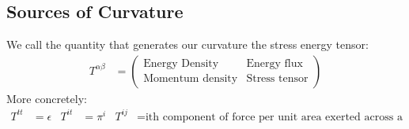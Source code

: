  \subsection{Sources of Curvature}
 We call the quantity that generates our curvature the stress energy tensor:
 \begin{align*}
	 T^{\alpha\beta} &= \begin{pmatrix}
		 \text{Energy Density} & \text{Energy flux} \\
		 \text{Momentum density} & \text{Stress tensor}
			    \end{pmatrix}
 \end{align*}
 More concretely:
 \begin{align*}
	 T^{tt} &= \epsilon & T^{it} &=\pi^i & T^{ij} &= \text{ith component of force per unit area exerted across a surface normal in the direction j}
 \end{align*}
